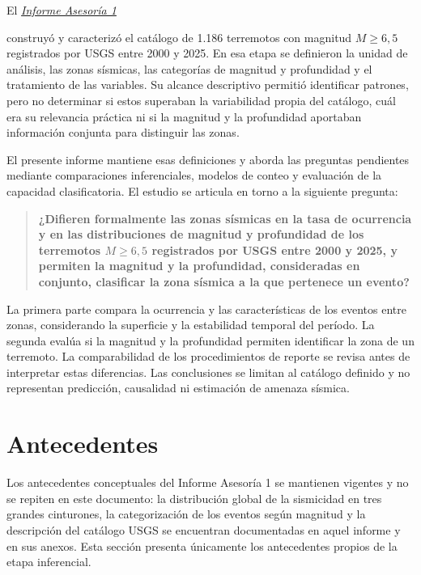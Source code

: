 \documentclass[
  spanish,
  letterpaper,
  DIV=11,
  numbers=noendperiod]{scrartcl}
\newcommand{\asesoriaExternalLink}[2]{%
  {\hypersetup{urlcolor=asesoriaLinkColor}\href{#1}{\textcolor{asesoriaLinkColor}{\emph{#2}}}}%
}
\begin{document}
El
\asesoriaExternalLink{https://mariajosevn.github.io/USGS-earthquake-analysis/Informes\%20Quarto/Informe\%20Asesor\%C3\%ADa\%201/Informe\%20Asesor\%C3\%ADa\%201\%20-\%20Actual.pdf}{Informe Asesoría 1}
construyó y caracterizó el catálogo de 1.186 terremotos con magnitud
\(M \geq 6{,}5\) registrados por USGS entre 2000 y 2025. En esa etapa se
definieron la unidad de análisis, las zonas sísmicas, las categorías de
magnitud y profundidad y el tratamiento de las variables. Su alcance
descriptivo permitió identificar patrones, pero no determinar si estos
superaban la variabilidad propia del catálogo, cuál era su relevancia
práctica ni si la magnitud y la profundidad aportaban información
conjunta para distinguir las zonas.

El presente informe mantiene esas definiciones y aborda las preguntas
pendientes mediante comparaciones inferenciales, modelos de conteo y
evaluación de la capacidad clasificatoria. El estudio se articula en
torno a la siguiente pregunta:

\begin{quote}
\textbf{¿Difieren formalmente las zonas sísmicas en la tasa de
ocurrencia y en las distribuciones de magnitud y profundidad de los
terremotos \(M \geq 6{,}5\) registrados por USGS entre 2000 y 2025, y
permiten la magnitud y la profundidad, consideradas en conjunto,
clasificar la zona sísmica a la que pertenece un evento?}
\end{quote}

La primera parte compara la ocurrencia y las características de los
eventos entre zonas, considerando la superficie y la estabilidad
temporal del período. La segunda evalúa si la magnitud y la profundidad
permiten identificar la zona de un terremoto. La comparabilidad de los
procedimientos de reporte se revisa antes de interpretar estas
diferencias. Las conclusiones se limitan al catálogo definido y no
representan predicción, causalidad ni estimación de amenaza sísmica.

\newpage

\section{Antecedentes}\label{antecedentes}

Los antecedentes conceptuales del Informe Asesoría 1 se mantienen
vigentes y no se repiten en este documento: la distribución global de la
sismicidad en tres grandes cinturones, la categorización de los eventos
según magnitud y la descripción del catálogo USGS se encuentran
documentadas en aquel informe y en sus anexos. Esta sección presenta
únicamente los antecedentes propios de la etapa inferencial.
\end{document}
